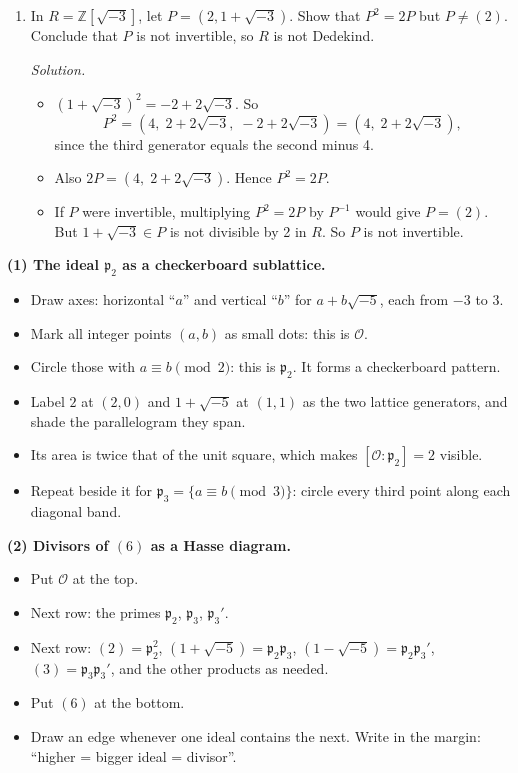 \documentclass[11pt]{article}
\newcommand{\Z}{\mathbb{Z}}
\newcommand{\cO}{\mathcal{O}}
\newcommand{\fp}{\mathfrak{p}}
\begin{document}
\begin{enumerate}[label=\textbf{Q2.\arabic*}]
  \item In $R=\Z[\sqrt{-3}]$, let $P=(2,1+\sqrt{-3})$. Show that $P^2=2P$ but $P\ne(2)$. Conclude that $P$ is not invertible, so $R$ is not Dedekind.

  \textit{Solution.}
  \begin{itemize}
    \item $(1+\sqrt{-3})^2=-2+2\sqrt{-3}$. So
    \[
    P^2=(4,\;2+2\sqrt{-3},\;-2+2\sqrt{-3})=(4,\;2+2\sqrt{-3}),
    \]
    since the third generator equals the second minus 4.
    \item Also $2P=(4,\;2+2\sqrt{-3})$. Hence $P^2=2P$.
    \item If $P$ were invertible, multiplying $P^2=2P$ by $P^{-1}$ would give $P=(2)$. But $1+\sqrt{-3}\in P$ is not divisible by 2 in $R$. So $P$ is not invertible.
  \end{itemize}
\end{enumerate}

\begin{instructornote}
\textbf{(1) The ideal $\fp_2$ as a checkerboard sublattice.}
\begin{itemize}
  \item Draw axes: horizontal ``$a$'' and vertical ``$b$'' for $a+b\sqrt{-5}$, each from $-3$ to $3$.
  \item Mark all integer points $(a,b)$ as small dots: this is $\cO$.
  \item Circle those with $a\equiv b\pmod 2$: this is $\fp_2$. It forms a checkerboard pattern.
  \item Label $2$ at $(2,0)$ and $1+\sqrt{-5}$ at $(1,1)$ as the two lattice generators, and shade the parallelogram they span.
  \item Its area is twice that of the unit square, which makes $[\cO:\fp_2]=2$ visible.
  \item Repeat beside it for $\fp_3=\{a\equiv b\pmod3\}$: circle every third point along each diagonal band.
\end{itemize}

\textbf{(2) Divisors of $(6)$ as a Hasse diagram.}
\begin{itemize}
  \item Put $\cO$ at the top.
  \item Next row: the primes $\fp_2$, $\fp_3$, $\fp_3'$.
  \item Next row: $(2)=\fp_2^2$, $(1+\sqrt{-5})=\fp_2\fp_3$, $(1-\sqrt{-5})=\fp_2\fp_3'$, $(3)=\fp_3\fp_3'$, and the other products as needed.
  \item Put $(6)$ at the bottom.
  \item Draw an edge whenever one ideal contains the next. Write in the margin: ``higher = bigger ideal = divisor''.
\end{itemize}
\end{instructornote}
\end{document}
